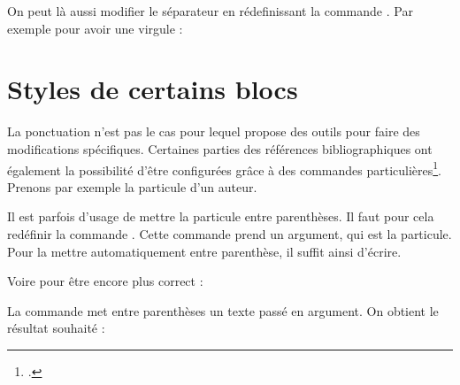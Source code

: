 \bibverbose
\begin{quotation}
\cites{Saxer1980}{Junod1992}
\end{quotation}
\bibverbosetrad

On peut là aussi modifier le séparateur en rédefinissant la commande . Par exemple pour avoir une virgule :

\begin{latexcode}
\renewcommand{\multicitedelim}[0]{\addcomma\addspace}
\end{latexcode}


\section{Styles de certains blocs}

La ponctuation n'est pas le cas pour lequel   propose des outils pour faire des modifications spécifiques. Certaines parties des références bibliographiques ont également  la possibilité d'être configurées grâce à des commandes particulières\footcite{biblatex_hooks}. Prenons par exemple la particule d'un auteur.
    
    \bibverbose
    \begin{quotation}
    \cite{BeauvoirSexe}
    \end{quotation}
    
    \renewcommand{\mkbibnameprefix}[1]{\parentext{#1}}


    
Il est parfois d'usage de mettre la particule entre parenthèses. Il faut pour cela redéfinir la commande . Cette commande prend un argument, qui est la particule. Pour la mettre automatiquement entre parenthèse, il suffit ainsi d'écrire.
    
    \begin{latexcode}
\renewcommand{\mkbibnameprefix}[1]{(#1)}
    \end{latexcode}

    
Voire pour être encore plus correct :
    
    \begin{latexcode}
\renewcommand{\mkbibnameprefix}[1]{\parentext{#1}}
    \end{latexcode}


La commande  met entre parenthèses un texte passé en argument. On obtient le résultat souhaité : 

    \begin{quotation}
    \cite{BeauvoirSexe}
    \end{quotation}
    
